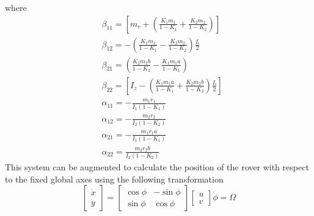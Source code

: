 \documentclass{article}
\begin{document}
	where
	\[\begin{split}
	&\beta_{11} = \left[m_r+\left(\frac{K_1m_1}{1-K_1}+\frac{K_2m_2}{1-K_2}\right)\right]\\
	&\beta_{12} =-\left(\frac{K_1m_1}{1-K_1}-\frac{K_2m_2}{1-K_2}\right)\frac{L}{2} \\
	&\beta_{21} = \left(\frac{K_2m_2b}{1-K_2}-\frac{K_1m_1a}{1-K_1}\right)\\
	&\beta_{22} = \left[I_z-\left(\frac{K_1m_1a}{1-K_1}+\frac{K_2m_2b}{1-K_2}\right)\frac{L}{2}\right]\\
	&\alpha_{11} = -\frac{m_1r_1}{I_1(1-K_1)}\\
	&\alpha_{12} = -\frac{m_2r_2}{I_2(1-K_2)}\\
	&\alpha_{21} = -\frac{m_1r_1a}{I_1(1-K_1)}\\
	&\alpha_{22} = \frac{m_2r_2b}{I_2(1-K_2)}
	\end{split}
	\]
	This system can be augmented to calculate the position of the rover with respect to the fixed global axes using the following transformation 
	\begin{subequations}
		\begin{equation}
		\begin{bmatrix}
		\dot{x}\\ \dot{y}
		\end{bmatrix} = \begin{bmatrix}
		\cos\phi& -\sin\phi\\ \sin\phi& \cos\phi
		\end{bmatrix}\begin{bmatrix}
		u\\v
		\end{bmatrix}
		\end{equation}
		\begin{equation}
		\dot{\phi} = \Omega
		\end{equation}
	\end{subequations}
	
\end{document}
